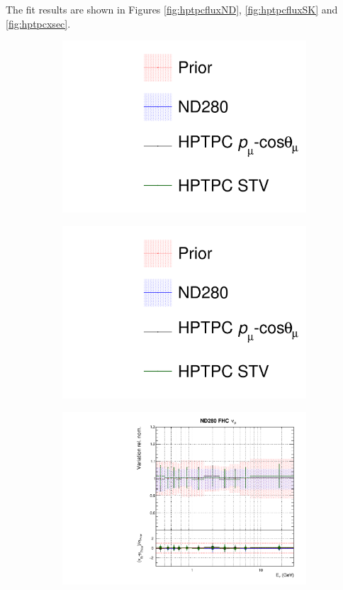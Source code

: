 The fit results are shown in Figures \ref{fig:hptpcfluxND}, \ref{fig:hptpcfluxSK} and \ref{fig:hptpcxsec}.

\begin{figure}[t]
\centering
\begin{subfigure}{0.3\textwidth}
  \centering
  \includegraphics[width=1.0\linewidth, trim={5mm  90mm 0mm 0mm}, clip]{figs/hptpcfits_leg}	
\end{subfigure}
\begin{subfigure}{0.3\textwidth}
  \centering
  \includegraphics[width=1.0\linewidth, trim={5mm  0mm 0mm 95mm}, clip]{figs/hptpcfits_leg}	
\end{subfigure}
\begin{subfigure}{0.45\textwidth}
  \centering
  \includegraphics[width=0.75\linewidth]{figs/hptpcfitsflux_0}

\end{subfigure}
\end{figure}
